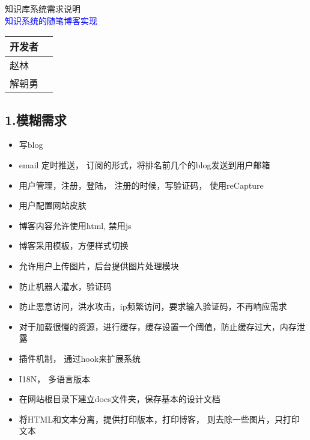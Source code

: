 \documentclass[a4paper,oneside,12pt]{book}
\newenvironment{SChinese}{
  \CJKfamily{gkai}
  \CJKtilde
  \CJKnospace}{}
\begin{document}
\begin{CJK*}{UTF8}{kai}
\begin{SChinese}
\begin{center}
\huge{知识库系统需求说明}\\
 \textcolor{blue}{\Large{知识系统的随笔博客实现}\\}
 \normalsize{}
\vspace{1cm} 
\begin{tabular}{|l|l|}
\hline
开发者\\
\hline
赵林\\
\hline
解朝勇\\
\hline
\end{tabular}
\end{center}
\begin{flushleft}
\section*{1.模糊需求}
\begin{itemize}
\item{写blog}
\item{email 定时推送， 订阅的形式，将排名前几个的blog发送到用户邮箱}
\item{用户管理，注册，登陆， 注册的时候，写验证码， 使用reCapture}
\item{用户配置网站皮肤}
\item{博客内容允许使用html, 禁用js}
\item{博客采用模板，方便样式切换}
\item{允许用户上传图片，后台提供图片处理模块}
\item{防止机器人灌水，验证码}
\item{防止恶意访问，洪水攻击，ip频繁访问，要求输入验证码，不再响应需求}
\item{对于加载很慢的资源，进行缓存，缓存设置一个阈值，防止缓存过大，内存泄露}
\item{插件机制， 通过hook来扩展系统}
\item{I18N， 多语言版本}
\item{在网站根目录下建立docs文件夹，保存基本的设计文档}
\item{将HTML和文本分离，提供打印版本，打印博客， 则去除一些图片，只打印文本}
\end{itemize}

\end{flushleft}
\end{SChinese}
\end{CJK*}
\end{document}
